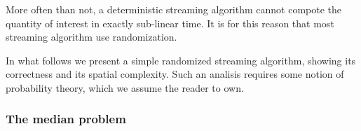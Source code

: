 \documentclass{subfiles}
\begin{document}
\label{sec:randomized-streaming}
    More often than not, a deterministic streaming algorithm cannot compote the quantity of interest 
        in exactly sub-linear time. It is for this reason that most streaming algorithm use randomization.

    In what follows we present a simple randomized streaming algorithm,
        showing its correctness and its spatial complexity.
        Such an analisis requires some notion of probability theory,
        which we assume the reader to own.

    \subsubsection{The median problem}
    
\end{document}
